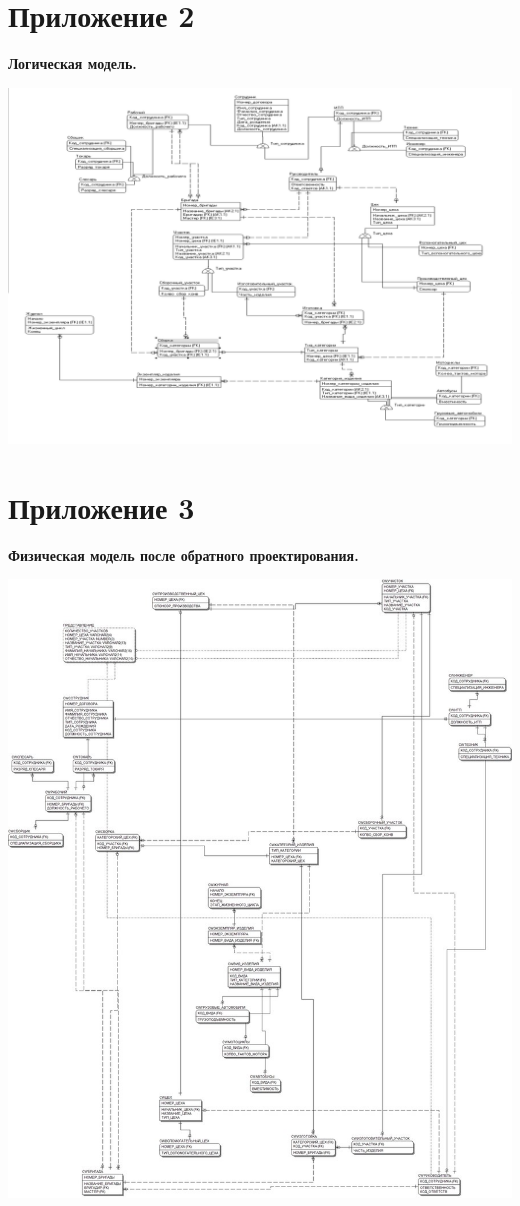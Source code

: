 \newpage

\section{Приложение 2}

    {\bf Логическая модель.}

    \includegraphics[width=16cm]{./screenshots/model/logical.png}

\newpage

\section{Приложение 3}

    {\bf Физическая модель после обратного проектирования.}

    \includegraphics[width=16cm]{./screenshots/model/reverse.jpg}

